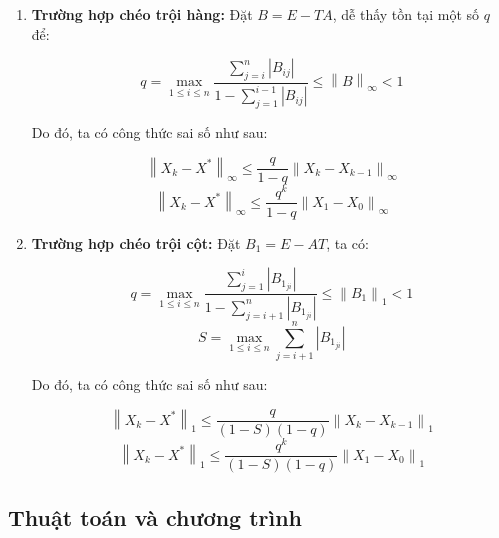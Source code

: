     \begin{enumerate}[label = (\roman*)]
        \item \textbf{Trường hợp chéo trội hàng:} Đặt $B = E - TA$, dễ thấy tồn tại một số $q$ để:
        
        $$ q = \max\limits_{1 \leq i \leq n} \frac{\sum\limits_{j=i}^{n} \left\lvert B_{ij} \right\rvert}{1 - \sum\limits_{j=1}^{i-1} \left\lvert B_{ij} \right\rvert} \leq \left\lVert B \right\rVert_{\infty} < 1 $$
        
        Do đó, ta có công thức sai số như sau:
        
        \begin{equation}
            \left\lVert X_{k} - X^{*} \right\rVert_{\infty} \leq \frac{q}{1 - q} \left\lVert X_{k} - X_{k - 1} \right\rVert_{\infty}
        \end{equation}
        \begin{equation}
            \left\lVert X_{k} - X^{*} \right\rVert_{\infty} \leq \frac{q^{k}}{1 - q} \left\lVert X_{1} - X_{0} \right\rVert_{\infty}
        \end{equation}

        \newpage

        \item \textbf{Trường hợp chéo trội cột:} Đặt $B_{1} = E - AT$, ta có:
        
        $$ q = \max\limits_{1 \leq i \leq n} \frac{\sum\limits_{j=1}^{i} \left\lvert B_{1_{ji}} \right\rvert}{1 - \sum\limits_{j=i+1}^{n} \left\lvert B_{1_{ji}} \right\rvert} \leq \left\lVert B_{1} \right\rVert_{1} < 1 $$ 
        $$ S = \max\limits_{1 \leq i \leq n} \sum\limits_{j=i+1}^{n} \left\lvert B_{1_{ji}} \right\rvert $$
        
        Do đó, ta có công thức sai số như sau\cite{giaotrinhgiaitichso}: 
        
        \begin{equation}
            \left\lVert X_{k} - X^{*} \right\rVert_{1} \leq \frac{q}{(1 - S)(1 - q)} \left\lVert X_{k} - X_{k - 1} \right\rVert_{1} 
        \end{equation}
        \begin{equation}
            \left\lVert X_{k} - X^{*} \right\rVert_{1} \leq \frac{q^{k}}{(1 - S)(1 - q)} \left\lVert X_{1} - X_{0} \right\rVert_{1}
        \end{equation}

    \end{enumerate}

\subsection{Thuật toán và chương trình}

    
